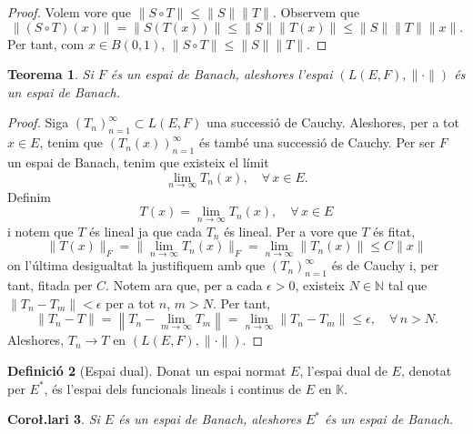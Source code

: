 \documentclass[12pt]{book}
\newtheorem{teorema}{Teorema}[chapter]
\newtheorem{coro}[teorema]{Coro\l.lari}
\theoremstyle{definition}
\newtheorem{defi}[teorema]{Definició}
\theoremstyle{nota}
\theoremstyle{exemple}
\begin{document}
\begin{proof}
  Volem vore que $\|S \circ T\| \leq \|S\| \|T\|$. Observem que
  \[
    \|(S \circ T)(x)\| = \|S(T(x))\| \leq \|S\| \|T(x)\| \leq
    \|S\| \|T\| \|x\|.
  \]
  Per tant, com $x \in B(0,1)$, $\|S \circ T\| \leq \|S\| \|T\|$.
\end{proof}

\begin{teorema}
  Si $F$ és un espai de Banach, aleshores l'espai
  $(L(E,F), \|\cdot\|)$ és un espai de Banach.
\end{teorema}

\begin{proof}
  Siga $(T_n)_{n=1}^\infty \subset L(E, F)$ una successió de
  Cauchy. Aleshores, per a tot $x \in E$, tenim que
  $(T_n(x))_{n=1}^\infty$ és també una successió de Cauchy. Per ser
  $F$ un espai de Banach, tenim que existeix el límit
  \[
    \lim_{n \to \infty} T_n(x), \quad \forall\, x \in E.
  \]
  Definim
  \[
    T(x) = \lim_{n \to \infty} T_n(x), \quad \forall\, x \in E
  \]
  i notem que $T$ és lineal ja que cada $T_n$ és lineal. Per a vore
  que $T$ és fitat,
  \[
    \|T(x)\|_F = \|\lim_{n \to \infty} T_n(x)\|_F = \lim_{n \to
      \infty} \|T_n(x)\| \leq C \|x\|
  \]
  on l'última desigualtat la justifiquem amb que $(T_n)_{n=1}^\infty$
  és de Cauchy i, per tant, fitada per $C$. Notem ara que, per a cada
  $\epsilon > 0$, existeix $N \in \mathbb{N}$ tal que
  $\|T_n - T_m\| < \epsilon$ per a tot $n,\, m > N$. Per tant,
  \[
    \|T_n - T\| = \left\| T_n - \lim_{m \to \infty} T_m\right\| =
    \lim_{n \to \infty} \|T_n - T_m\| \leq \epsilon, \quad \forall\, n
    > N.
  \]
  Aleshores, $T_n \to T$ en $(L(E,F), \|\cdot\|)$.
\end{proof}

\begin{defi}[Espai dual]
  Donat un espai normat $E$, l'espai dual de $E$, denotat per $E^*$,
  és l'espai dels funcionals lineals i continus de $E$ en
  $\mathbb{K}$.
\end{defi}

\begin{coro}
  Si $E$ és un espai de Banach, aleshores $E^*$ és un espai de Banach.
\end{coro}
\end{document}
